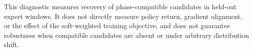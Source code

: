 



This diagnostic measures recovery of phase-compatible candidates in
held-out expert windows. It does not directly measure policy return,
gradient alignment, or the effect of the soft-weighted training objective,
and does not guarantee robustness when compatible candidates are absent
or under arbitrary distribution shift.
